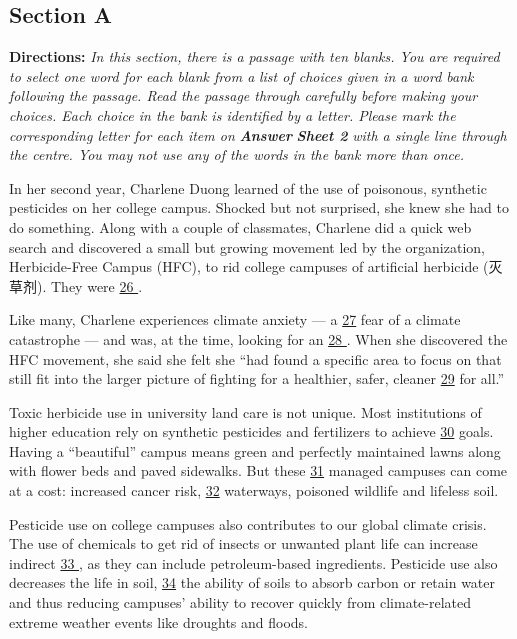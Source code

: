 \documentclass[UTF8,11pt]{ctexart}
\begin{document}
\subsection*{\textbf{Section A}}


\textbf{Directions:} \textit{In this section, there is a passage with ten blanks. You are required to select one word for each blank from a} \textit{list of choices given in a word bank following the passage. Read the passage through carefully before making your} \textit{choices. Each choice in the bank is identified by a letter. Please mark the corresponding letter for each item on }\textbf{\textit{Answer}} \textbf{\textit{Sheet 2}}\textit{ with a single line through the centre. You may not use any of the words in the bank more than once.}


In her second year, Charlene Duong learned of the use of poisonous, synthetic pesticides on her college campus. Shocked but not surprised, she knew she had to do something. Along with a couple of classmates, Charlene did a quick web search and discovered a small but growing movement led by the organization, Herbicide-Free Campus (HFC), to rid college campuses of artificial herbicide (灭草剂). They were \uline{26 }.


Like many, Charlene experiences climate anxiety — a \uline{27} fear of a climate catastrophe — and was, at the time, looking for an \uline{28 }. When she discovered the HFC movement, she said she felt she “had found a specific area to focus on that still fit into the larger picture of fighting for a healthier, safer, cleaner \uline{29} for all.”


Toxic herbicide use in university land care is not unique. Most institutions of higher education rely on synthetic pesticides and fertilizers to achieve \uline{30} goals. Having a “beautiful” campus means green and perfectly maintained lawns along with flower beds and paved sidewalks. But these \uline{31} managed campuses can come at a cost: increased cancer risk, \uline{32} waterways, poisoned wildlife and lifeless soil.


Pesticide use on college campuses also contributes to our global climate crisis. The use of chemicals to get rid of insects or unwanted plant life can increase indirect \uline{33 }, as they can include petroleum-based ingredients. Pesticide use also decreases the life in soil, \uline{34} the ability of soils to absorb carbon or retain water and thus reducing campuses’ ability to recover quickly from climate-related extreme weather events like droughts and floods.
\end{document}
